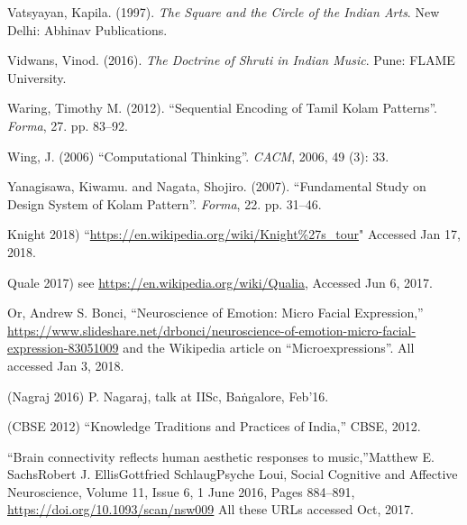 \begin{thebibliography}{99}
Vatsyayan, Kapila. (1997). \textsl{The Square and the Circle of the Indian Arts}. New Delhi: Abhinav Publications.

Vidwans, Vinod. (2016). \textsl{The Doctrine of Shruti in Indian Music}. Pune: FLAME University.

Waring, Timothy M. (2012). “Sequential Encoding of Tamil Kolam Patterns”. \textsl{Forma}, 27. pp. 83--92.

Wing, J. (2006) “Computational Thinking”. \textsl{CACM}, 2006, 49 (3): 33.

Yanagisawa, Kiwamu. and Nagata, Shojiro. (2007). “Fundamental Study on Design System of Kolam Pattern”. \textsl{Forma}, 22. pp. 31--46.

Knight 2018) “\url{https://en.wikipedia.org/wiki/Knight%27s_tour}" 
Accessed Jan 17, 2018.

Quale 2017) see \url{https://en.wikipedia.org/wiki/Qualia}, Accessed Jun 6, 2017.

Or, Andrew S. Bonci, “Neuroscience of Emotion: Micro Facial Expression,” \url{https://www.slideshare.net/drbonci/neuroscience-of-emotion-micro-facial-expression-83051009} and the Wikipedia article on “Microexpressions”. All accessed Jan 3, 2018.

(Nagraj 2016) P. Nagaraj, talk at IISc, Baṅgalore, Feb’16.

(CBSE 2012) “Knowledge Traditions and Practices of India,” CBSE, 2012.

“Brain connectivity reflects human aesthetic responses to music,”Matthew E. SachsRobert J. EllisGottfried SchlaugPsyche Loui, Social Cognitive and Affective Neuroscience, Volume 11, Issue 6, 1 June 2016, Pages 884--891, \url{https://doi.org/10.1093/scan/nsw009} All these URLs accessed Oct, 2017.
\end{thebibliography}

\theendnotes
